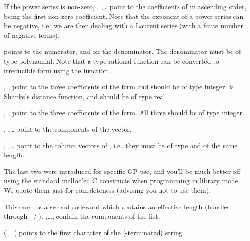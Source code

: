 If the power series is non-zero, , ,\dots
{} point to the coefficients of  in ascending order,
 being the first non-zero coefficient.  Note that the exponent of a
power series can be negative, i.e.~we are then dealing with a Laurent series
(with a finite number of negative terms).

%
 points to the numerator, and  on the denominator. The
denominator must be of type polynomial. Note that a type 
rational function can be converted to irreducible form using the function
.

%
, ,  point to the three coefficients of the
form and should be of type integer.  is Shanks's distance
function, and should be of type real.

%
, ,  point to the three coefficients of the
form. All three should be of type integer.

%
, ,\dots {} point to the components of
the vector.

, ,\dots {} point to the column vectors
of , i.e.~they must be of type  and of the same length.

\noindent The last two were introduced for specific GP use, and you'll be
much better off using the standard malloc'ed C constructs when programming
in library mode. We quote them just for completeness (advising you not to
use them):

This one has a second codeword which contains an effective length (handled
through ~/ ). ,\dots, 
contain the components of the list.

%
 (= ) points to the first character of the
(-terminated) string.

